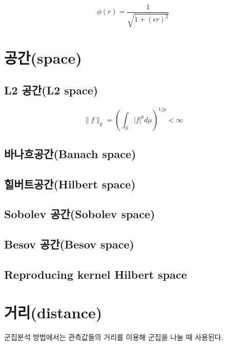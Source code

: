 \documentclass[b5paper,]{book}
\theoremstyle{definition}
\theoremstyle{definition}
\theoremstyle{definition}
\theoremstyle{remark}
\begin{document}
\[\phi(r)=\frac{1}{\sqrt{1+(\epsilon r)^{2}}}\]

\section{공간(space)}\label{space}

\subsection{L2 공간(L2 space)}\label{l2-l2-space}

\[\| f\|_{p}=(\int_{S}|f|^{p}d\mu)^{1/p}<\infty\]

\subsection{바나흐공간(Banach space)}\label{banach-space}

\subsection{힐버트공간(Hilbert space)}\label{hilbert-space}

\subsection{Sobolev 공간(Sobolev space)}\label{sobolev-sobolev-space}

\subsection{Besov 공간(Besov space)}\label{besov-besov-space}

\subsection{Reproducing kernel Hilbert
space}\label{reproducing-kernel-hilbert-space}

\section{거리(distance)}\label{distance}

군집분석 방법에서는 관측값들의 거리를 이용해 군집을 나눌 때 사용된다.
\end{document}
